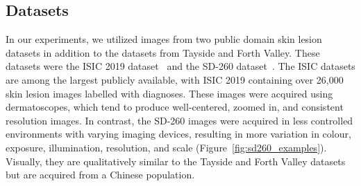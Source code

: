 \subsection{Datasets}
\label{subsec:generalisation_datasets}
In our experiments, we utilized images from two public domain skin lesion datasets in addition to the datasets from Tayside and Forth Valley. These datasets were the ISIC 2019 dataset~\citep{codella2018skin,combalia2019bcn20000,tschandl2018ham10000} and the SD-260 dataset~\citep{yang2019self}. The ISIC datasets are among the largest publicly available, with ISIC 2019 containing over 26,000 skin lesion images labelled with diagnoses. These images were acquired using dermatoscopes, which tend to produce well-centered, zoomed in, and consistent resolution images. In contrast, the SD-260 images were acquired in less controlled environments with varying imaging devices, resulting in more variation in colour, exposure, illumination, resolution, and scale (Figure~\ref{fig:sd260_examples}). Visually, they are qualitatively similar to the Tayside and Forth Valley datasets but are acquired from a Chinese population.

